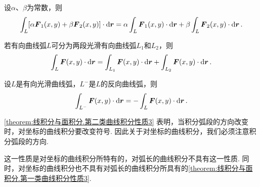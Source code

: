 \begin{property}\label{theorem:线积分与面积分.第二类曲线积分性质1}
设\(\alpha\)、\(\beta\)为常数，则\[
\int_L [\alpha \boldsymbol{F}_1(x,y) + \beta \boldsymbol{F}_2(x,y)] \cdot \dd{\boldsymbol{r}}
= \alpha \int_L \boldsymbol{F}_1(x,y) \cdot \dd{\boldsymbol{r}}
+ \beta \int_L \boldsymbol{F}_2(x,y) \cdot \dd{\boldsymbol{r}}.
\]
\end{property}

\begin{property}\label{theorem:线积分与面积分.第二类曲线积分性质2}
若有向曲线弧\(L\)可分为两段光滑有向曲线弧\(L_1\)和\(L_2\)，则\[
\int_L \boldsymbol{F}(x,y) \cdot \dd{\boldsymbol{r}}
= \int_{L_1} \boldsymbol{F}(x,y) \cdot \dd{\boldsymbol{r}}
+ \int_{L_2} \boldsymbol{F}(x,y) \cdot \dd{\boldsymbol{r}}.
\]
\end{property}

\begin{property}\label{theorem:线积分与面积分.第二类曲线积分性质3}
设\(L\)是有向光滑曲线弧，\(L^-\)是\(L\)的反向曲线弧，则\[
\int_{L^-} \boldsymbol{F}(x,y) \cdot \dd{\boldsymbol{r}}
= - \int_L \boldsymbol{F}(x,y) \cdot \dd{\boldsymbol{r}}.
\]
\end{property}
\cref{theorem:线积分与面积分.第二类曲线积分性质3} 表明，当积分弧段的方向改变时，对坐标的曲线积分要改变符号.
因此关于对坐标的曲线积分，我们必须注意积分弧段的方向.

这一性质是对坐标的曲线积分所特有的，对弧长的曲线积分不具有这一性质.
同时，对坐标的曲线积分也不具有对弧长的曲线积分所具有的\cref{theorem:线积分与面积分.第一类曲线积分性质3}.

